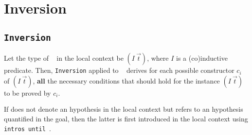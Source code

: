 \section{Inversion}
\label{Inversion}

\subsection{\tt Inversion {\ident}}

Let the type of \ident~ in the local context be $(I~\vec{t})$,
where $I$ is a (co)inductive predicate. Then,
\texttt{Inversion} applied to \ident~ derives for each possible
constructor $c_i$ of $(I~\vec{t})$, {\bf all} the necessary
conditions that should hold for the instance $(I~\vec{t})$ to be
proved by $c_i$.

\Rem If {\ident} does not denote an hypothesis in the local context
but refers to an hypothesis quantified in the goal, then the
latter is first introduced in the local context using
\texttt{intros until \ident}.

